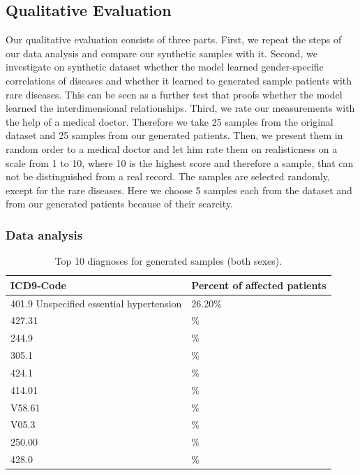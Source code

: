 \documentclass[11pt, a4paper]{book}
\begin{document}
\subsection{Qualitative Evaluation}
Our qualitative evaluation consists of three parts. First, we repeat the steps of our data analysis and compare our synthetic samples with it. Second, we investigate on synthetic dataset whether the model learned gender-specific correlations of diseases and whether it learned to generated sample patients with rare diseases. This can be seen as a further test that proofs whether the model learned the interdimensional relationships. Third, we rate our measurements with the help of a medical doctor. Therefore we take 25 samples from the original dataset and 25 samples from our generated patients. Then, we present them in random order to a medical doctor and let him rate them on realisticness on a scale from 1 to 10, where 10 is the highest score and therefore a sample, that can not be distinguished from a real record.
The samples are selected randomly, except for the rare diseases. Here we choose 5 samples each from the dataset and from our generated patients because of their scarcity.

\subsubsection{Data analysis}

\begin{table}
\begin{tabular}{l|l}
\textbf{ICD9-Code} & \textbf{Percent of affected patients}\\
\hline
401.9 Unspecified essential hypertension & 26.20\%\\
427.31 & \%\\
244.9 & \%\\
305.1 & \%\\
424.1 & \%\\
414.01 & \%\\
V58.61 & \%\\
V05.3 & \%\\
250.00 & \%\\
428.0 & \%\\
\end{tabular}
\caption{\label{tab:top10-icd-mixed}Top 10 diagnoses for generated samples (both sexes).}
\end{table}
\end{document}
